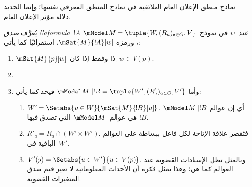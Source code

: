 \documentclass[../../../include/open-logic-section]{subfiles}
\begin{document}


نماذج منطق الإعلان العام العلائقية هي نماذج المنطق المعرفي نفسها؛ وإنما
الجديد دلالة مؤثر الإعلان العام.

\begin{defn} يُعرَّف \emph{صدق !!a{formula}~$!A$
  عند~$w$} في نموذج~$\mModel M = \tuple{W,(R_a)_{a \in G},V}$، ورمزه
  $\mSat{M}{!A}[w]$، استقرائيًا كما يأتي:
  \begin{enumerate}
  \item $\mSat{M}{p}[w]$ إذا وفقط إذا كان $w \in V(p)$.
  \item{}
  \item{}

  
  وأما $\mModel M \mid !B = \tuple{W',(R'_a)_{a \in G},V'}$ فيحد كما يأتي:
  \begin{enumerate}
    \item $W' = \Setabs{ u \in W}{\mSat{M}{!B}[u]}$. أي إن عوالم
      $\mModel M \mid !B$ هي عوالم~$\mModel M$ التي تصدق فيها $!B$.
    \item $R'_a = R_a \cap (W' \times W')$. فتُقصر علاقة الإتاحة لكل
      فاعل ببساطة على العوالم الباقية في~$W'$.
    \item $V'(p) = \Setabs{ u \in W'}{u \in V(p) }$. وبالمثل تظل
      الإسنادات القضوية عند العوالم كما هي؛ وهذا يمثل فكرة أن الأحداث
      المعلوماتية لا تغير قيم صدق المتغيرات القضوية.
  \end{enumerate}
  
  \end{enumerate} 
\end{defn}
\end{document}
